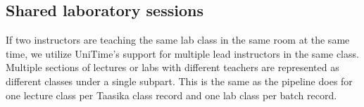 \subsection{Shared laboratory sessions}

If two instructors are teaching the same lab class in the same room at the same time, we utilize UniTime's support for multiple lead instructors in the same class.
Multiple sections of lectures or labs with different teachers are represented as different classes under a single subpart.
This is the same as the pipeline does for one lecture class per Taasika class record and one lab class per batch record.
